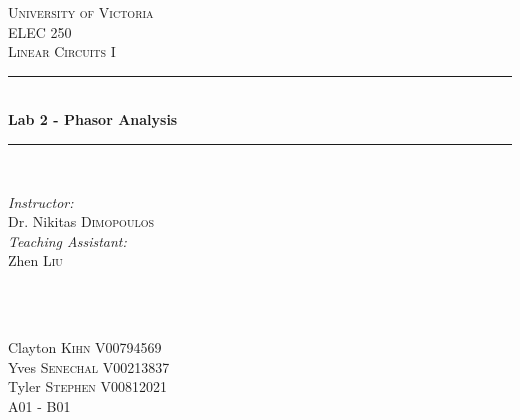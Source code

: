 \documentclass[12pt]{article}
\newcommand{\HRule}{\rule{\linewidth}{0.5mm}}
\begin{document}

\begin{titlepage}

\center
 
\textsc{\LARGE University of Victoria}\\[1cm] 	%
\textsc{\Large ELEC 250}\\[0.5cm] 			%
\textsc{\large Linear Circuits I}\\[0.5cm] 		%


\HRule \\[0.4cm]
{ \huge \bfseries Lab 2 - Phasor Analysis}\\[0.2cm] %
\HRule \\[1.5cm]
 
 
\begin{minipage}{0.7\textwidth}
\begin{flushleft} 

\large\emph{Instructor:} \\
Dr. Nikitas \textsc{Dimopoulos} \\
\vspace{12 pt}
\emph{Teaching Assistant:} \\
Zhen \textsc{Liu}

\end{flushleft}
\end{minipage}
~
\begin{minipage}{0.1\textwidth}
\begin{flushright} \large
\vspace{12 pt}
\end{flushright}
\end{minipage}\\[2cm]


\Large Clayton \textsc{Kihn}
\large V00794569	\\
\Large Yves \textsc{Senechal}
\large V00213837	\\
\Large Tyler \textsc{Stephen}
\large V00812021	\\
A01 - B01\\[1.5cm] 



\end{titlepage}
\end{document}
